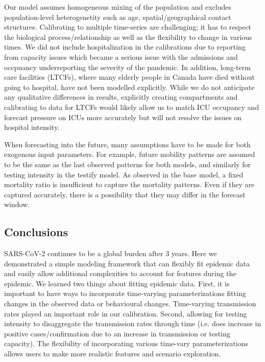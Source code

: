 \documentclass[12pt]{article}\usepackage[]{graphicx}\usepackage[]{color}
\begin{document}
Our model assumes homogeneous mixing of the population and excludes population-level heterogenetity such as age, spatial/geographical contact structures.
Calibrating to multiple time-series are challenging; it has to respect the biological process/relationship as well as the flexibility to change in various times. 
We did not include hospitalization in the calibrations due to reporting from capacity issues which became a serious issue with the admissions and occpuancy underreporting the severity of the pandemic.
In addition, long-term care facilities (LTCFs), where many elderly people in Canada have died without going to hospital, have not been modelled explicitly.  
While we do not anticipate any qualitative differences in results, explicitly creating compartments and calibrating to data for LTCFs would likely allow us to match ICU occupancy and forecast
pressure on ICUs more accurately but will not resolve the issues on hospital intensity.

When forecasting into the future, many assumptions have to be made for both exogenous input parameters. For example, future mobility patterns are assumed to be the same as the last observed patterns for both models, and similarly for testing intensity in the testify model. As observed in the base model, a fixed mortality ratio is insufficient to capture the mortality patterns. Even if they are captured accurately, there is a possibility that they may differ in the forecast window.
 
\subsection{Conclusions}


SARS-CoV-2 continues to be a global burden after 3 years. 
Here we demonstrated a simple modeling framework that can flexibly fit epidemic data and easily allow additional complexities to account for features during the epidemic. 
We learned two things about fitting epidemic data. 
First, it is important to have ways to incorporate time-varying parameterizations fitting changes in the observed data or behavioural changes. Time-varying transmission rates played an important role in our calibration. 
Second, allowing for testing intensity to disaggregate the transmission rates through time (i.e. does increase in positive cases/confirmation due to an increase in transmission or testing capacity). 
The flexibility of incorporating various time-vary parameterizations allows users to make more realistic features and scenario exploration. 

\clearpage



\end{document}
